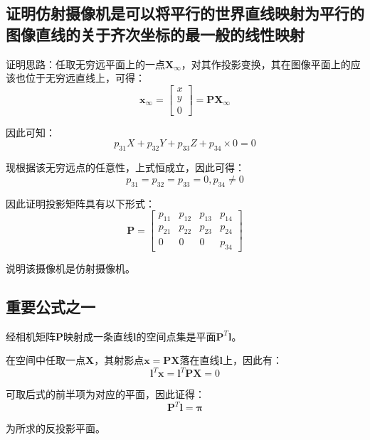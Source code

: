 \documentclass[11pt]{article}
\begin{document}
\subsection{证明仿射摄像机是可以将平行的世界直线映射为平行的图像直线的关于齐次坐标的最一般的线性映射}
证明思路：任取无穷远平面上的一点$\mathbf{X}_\infty$，对其作投影变换，其在图像平面上的应该也位于无穷远直线上，可得：
\begin{equation*}
  \mathbf{x}_\infty=\begin{bmatrix}
    x \\y\\0
  \end{bmatrix}=\mathbf{P}\mathbf{X}_\infty
\end{equation*}\par
因此可知：
\begin{equation*}
  p_{31}X+p_{32}Y+p_{33}Z+p_{34}\times0=0
\end{equation*}\par
现根据该无穷远点的任意性，上式恒成立，因此可得：
\begin{equation*}
  p_{31}=p_{32}=p_{33}=0,p_{34}\neq0
\end{equation*}\par
因此证明投影矩阵具有以下形式：
\begin{equation*}
  \mathbf{P}=\begin{bmatrix}
    p_{11} & p_{12} & p_{13} & p_{14} \\
    p_{21} & p_{22} & p_{23} & p_{24} \\
    0      & 0      & 0      & p_{34}
  \end{bmatrix}
\end{equation*}\par
说明该摄像机是仿射摄像机。
\subsection{重要公式之一}
{\heiti 经相机矩阵$\mathbf{P}$映射成一条直线$\mathbf{l}$的空间点集是平面$\mathbf{P}^T\mathbf{l}$}。\par
{}\par
在空间中任取一点$\mathbf{X}$，其射影点$\mathbf{x=PX}$落在直线$\mathbf{l}$上，因此有：
\begin{equation*}
  \mathbf{l}^T\mathbf{x}=\mathbf{l}^T\mathbf{PX}=0
\end{equation*}\par
可取后式的前半项为对应的平面，因此证得：
\begin{equation*}
  \mathbf{P}^T\mathbf{l}=\mathbold{\pi}
\end{equation*}\par
为所求的反投影平面。
\end{document}
